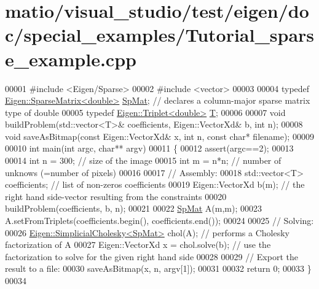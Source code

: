 \hypertarget{matio_2visual__studio_2test_2eigen_2doc_2special__examples_2_tutorial__sparse__example_8cpp_source}{}\section{matio/visual\+\_\+studio/test/eigen/doc/special\+\_\+examples/\+Tutorial\+\_\+sparse\+\_\+example.cpp}
\label{matio_2visual__studio_2test_2eigen_2doc_2special__examples_2_tutorial__sparse__example_8cpp_source}

\begin{DoxyCode}
00001 \textcolor{preprocessor}{#include <Eigen/Sparse>}
00002 \textcolor{preprocessor}{#include <vector>}
00003 
00004 \textcolor{keyword}{typedef} \hyperlink{group___sparse_core___module}{Eigen::SparseMatrix<double>} \hyperlink{group___sparse_core___module}{SpMat}; \textcolor{comment}{// declares a column-major
       sparse matrix type of double}
00005 \textcolor{keyword}{typedef} \hyperlink{group___sparse_core___module}{Eigen::Triplet<double>} \hyperlink{group___sparse_core___module_class_eigen_1_1_triplet}{T};
00006 
00007 \textcolor{keywordtype}{void} buildProblem(std::vector<T>& coefficients, Eigen::VectorXd& b, \textcolor{keywordtype}{int} n);
00008 \textcolor{keywordtype}{void} saveAsBitmap(\textcolor{keyword}{const} Eigen::VectorXd& x, \textcolor{keywordtype}{int} n, \textcolor{keyword}{const} \textcolor{keywordtype}{char}* filename);
00009 
00010 \textcolor{keywordtype}{int} main(\textcolor{keywordtype}{int} argc, \textcolor{keywordtype}{char}** argv)
00011 \{
00012   assert(argc==2);
00013   
00014   \textcolor{keywordtype}{int} n = 300;  \textcolor{comment}{// size of the image}
00015   \textcolor{keywordtype}{int} m = n*n;  \textcolor{comment}{// number of unknows (=number of pixels)}
00016 
00017   \textcolor{comment}{// Assembly:}
00018   std::vector<T> coefficients;            \textcolor{comment}{// list of non-zeros coefficients}
00019   Eigen::VectorXd b(m);                   \textcolor{comment}{// the right hand side-vector resulting from the constraints}
00020   buildProblem(coefficients, b, n);
00021 
00022   \hyperlink{group___sparse_core___module}{SpMat} A(m,m);
00023   A.setFromTriplets(coefficients.begin(), coefficients.end());
00024 
00025   \textcolor{comment}{// Solving:}
00026   \hyperlink{group___sparse_cholesky___module_class_eigen_1_1_simplicial_cholesky}{Eigen::SimplicialCholesky<SpMat>} chol(A);  \textcolor{comment}{// performs a Cholesky
       factorization of A}
00027   Eigen::VectorXd x = chol.solve(b);         \textcolor{comment}{// use the factorization to solve for the given right hand
       side}
00028 
00029   \textcolor{comment}{// Export the result to a file:}
00030   saveAsBitmap(x, n, argv[1]);
00031 
00032   \textcolor{keywordflow}{return} 0;
00033 \}
00034 
\end{DoxyCode}
